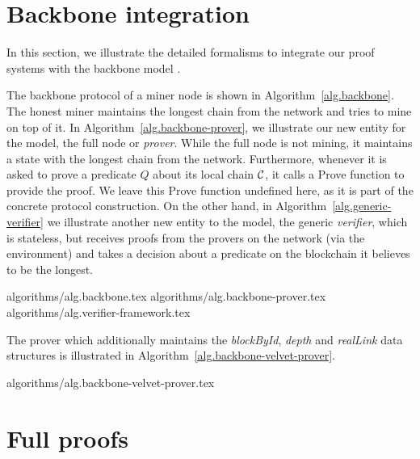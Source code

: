 \section{Backbone integration}
\label{sec.appendix-backbone}


In this section, we illustrate the detailed formalisms to integrate our proof
systems with the backbone model \cite{backbone}.

The backbone protocol of a miner node is shown in Algorithm~\ref{alg.backbone}.
The honest miner maintains the longest chain from the network and tries to mine
on top of it. In Algorithm~\ref{alg.backbone-prover}, we illustrate our new
entity for the model, the full node or \textit{prover}.  While the full node is
not mining, it maintains a state with the longest chain from the network.
Furthermore, whenever it is asked to prove a predicate $Q$ about its local
chain $\mathcal{C}$, it calls a Prove function to provide the proof.  We leave this
Prove function undefined here, as it is part of the concrete protocol
construction. On the other hand, in Algorithm~\ref{alg.generic-verifier} we
illustrate another new entity to the model, the generic \textit{verifier},
which is stateless, but receives proofs from the provers on the network (via
the environment) and takes a decision about a predicate on the blockchain it
believes to be the longest.

{algorithms/alg.backbone.tex}
{algorithms/alg.backbone-prover.tex}
{algorithms/alg.verifier-framework.tex}

The prover which additionally maintains the \textit{blockById},
\textit{depth} and \textit{realLink} data structures is illustrated in
Algorithm~\ref{alg.backbone-velvet-prover}.

{algorithms/alg.backbone-velvet-prover.tex}
\section{Full proofs}
\label{sec.proofs}

\restateThmSecurity*

